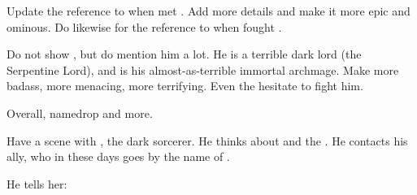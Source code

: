 \begin{changes}
  
  
  \begin{comment}
    \paragraph{What Slithers Beneath: To Do}
  \end{comment}
    Update the reference to when \Achsah met \Ishnaruchaefir.
    Add more details and make it more epic and ominous. 
    Do likewise for the reference to when \Teshrial fought \Zessuruch. 
    
    Do not show \Secherdamon, but do mention him a lot. 
    He is a terrible dark lord (the Serpentine Lord), and \LocarPsyrex is his almost-as-terrible immortal archmage. 
    Make \Psyrex more badass, more menacing, more terrifying. 
    Even the \resphain hesitate to fight him.
    
    Overall, namedrop \Psyrex and \Secherdamon more. 
    
    Have a scene with \Psyrex, the dark sorcerer.
    He thinks about \Ishnaruchaefir and the \resphain.
    He contacts his ally, who in these days goes by the name of \Takestsha. 
    
    He tells her:
\end{changes}










